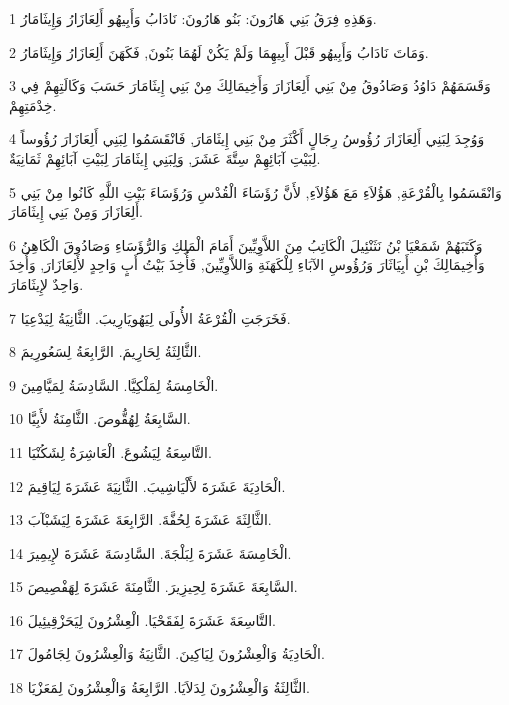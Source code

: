 \par 1 وَهَذِهِ فِرَقُ بَنِي هَارُونَ: بَنُو هَارُونَ: نَادَابُ وَأَبِيهُو أَلِعَازَارُ وَإِيثَامَارُ.
\par 2 وَمَاتَ نَادَابُ وَأَبِيهُو قَبْلَ أَبِيهِمَا وَلَمْ يَكُنْ لَهُمَا بَنُونَ, فَكَهَنَ أَلِعَازَارُ وَإِيثَامَارُ.
\par 3 وَقَسَمَهُمْ دَاوُدُ وَصَادُوقُ مِنْ بَنِي أَلِعَازَارَ وَأَخِيمَالِكَ مِنْ بَنِي إِيثَامَارَ حَسَبَ وَكَالَتِهِمْ فِي خِدْمَتِهِمْ.
\par 4 وَوُجِدَ لِبَنِي أَلِعَازَارَ رُؤُوسُ رِجَالٍ أَكْثَرَ مِنْ بَنِي إِيثَامَارَ, فَانْقَسَمُوا لِبَنِي أَلِعَازَارَ رُؤُوساً لِبَيْتِ آبَائِهِمْ سِتَّةَ عَشَرَ, وَلِبَنِي إِيثَامَارَ لِبَيْتِ آبَائِهِمْ ثَمَانِيَةٌ.
\par 5 وَانْقَسَمُوا بِالْقُرْعَةِ, هَؤُلاَءِ مَعَ هَؤُلاَءِ, لأَنَّ رُؤَسَاءَ الْقُدْسِ وَرُؤَسَاءَ بَيْتِ اللَّهِ كَانُوا مِنْ بَنِي أَلِعَازَارَ وَمِنْ بَنِي إِيثَامَارَ.
\par 6 وَكَتَبَهُمْ شَمَعْيَا بْنُ نَثَنْئِيلَ الْكَاتِبُ مِنَ اللاَّوِيِّينَ أَمَامَ الْمَلِكِ وَالرُّؤَسَاءِ وَصَادُوقَ الْكَاهِنُ وَأَخِيمَالِكَ بْنِ أَبِيَاثَارَ وَرُؤُوسِ الآبَاءِ لِلْكَهَنَةِ وَاللاَّوِيِّينَ, فَأُخِذَ بَيْتُ أَبٍ وَاحِدٍ لأَلِعَازَارَ, وَأُخِذَ وَاحِدٌ لإِيثَامَارَ.
\par 7 فَخَرَجَتِ الْقُرْعَةُ الأُولَى لِيَهُويَارِيبَ. الثَّانِيَةُ لِيَدْعِيَا.
\par 8 الثَّالِثَةُ لِحَارِيمَ. الرَّابِعَةُ لِسَعُورِيمَ.
\par 9 الْخَامِسَةُ لِمَلْكِيَّا. السَّادِسَةُ لِمَيَّامِينَ.
\par 10 السَّابِعَةُ لِهُقُّوصَ. الثَّامِنَةُ لأَبِيَّا.
\par 11 التَّاسِعَةُ لِيَشُوعَ. الْعَاشِرَةُ لِشَكُنْيَا.
\par 12 الْحَادِيَةَ عَشَرَةَ لأَلْيَاشِيبَ. الثَّانِيَةَ عَشَرَةَ لِيَاقِيمَ.
\par 13 الثَّالِثَةَ عَشَرَةَ لِحُفَّةَ. الرَّابِعَةَ عَشَرَةَ لِيَشَبْآبَ.
\par 14 الْخَامِسَةَ عَشَرَةَ لِبَلْجَةَ. السَّادِسَةَ عَشَرَةَ لإِيمِيرَ.
\par 15 السَّابِعَةَ عَشَرَةَ لِحِيزِيرَ. الثَّامِنَةَ عَشَرَةَ لِهَفْصِيصَ.
\par 16 التَّاسِعَةَ عَشَرَةَ لِفَقَحْيَا. الْعِشْرُونَ لِيَحَزْقِيئِيلَ.
\par 17 الْحَادِيَةُ وَالْعِشْرُونَ لِيَاكِينَ. الثَّانِيَةُ وَالْعِشْرُونَ لِجَامُولَ.
\par 18 الثَّالِثَةُ وَالْعِشْرُونَ لِدَلاَيَا. الرَّابِعَةُ وَالْعِشْرُونَ لِمَعَزْيَا.
